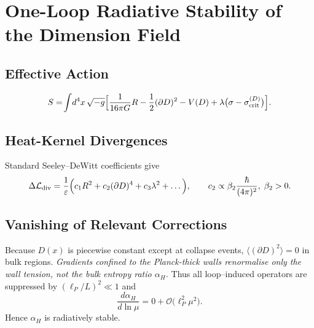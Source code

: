 \documentclass[a4paper, 12pt, oneside]{book}
\numberwithin{equation}{chapter}
\begin{document}


\chapter[One-Loop Stability]{One-Loop Radiative Stability of the Dimension Field}
\label{appendix:OneLoop}


\section{Effective Action}
\vspace{0.5\baselineskip}
\[ 
  S = \!\int\! d^4x\,\sqrt{-g}\Bigl[
        \frac{1}{16\pi G}R
      -\frac12(\partial D)^2
      -V(D)
      +\lambda\bigl(\sigma-\sigma_{\mathrm{crit}}^{(D)}\bigr)\Bigr].
\]

\section{Heat-Kernel Divergences}
Standard Seeley--DeWitt coefficients give
\[
  \Delta\mathcal L_{\text{div}} =
  \frac{1}{\varepsilon}
  \Bigl(c_1 R^2 + c_2 (\partial D)^4 + c_3 \lambda^2 + \dots\Bigr),
  \qquad
  c_2\propto\beta_2\frac{\hbar}{(4\pi)^2},\;\beta_2>0 .
\]

\section{Vanishing of Relevant Corrections}
Because $D(x)$ is piecewise constant except at collapse events,
\(\langle (\partial D)^2\rangle = 0\) in bulk regions.
\textit{Gradients confined to the Planck-thick walls renormalise only the
wall tension, not the bulk entropy ratio $\alpha_H$.}
Thus all loop–induced operators are suppressed by
$(\ell_P/L)^2\!\ll\!1$ and
\[
  \boxed{\; \frac{d\alpha_H}{d\ln\mu}=0
          +\mathcal O\!\bigl(\ell_P^2\mu^2\bigr). \;}
\]
Hence $\alpha_H$ is radiatively stable.

\end{document}
